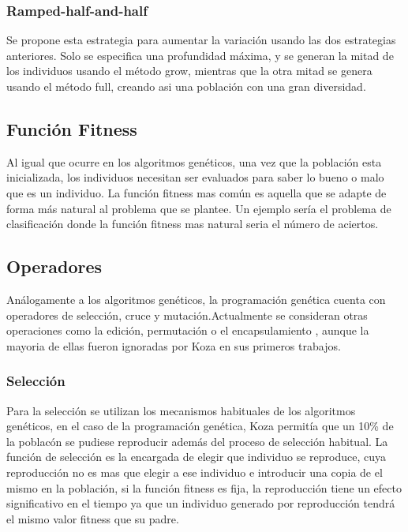 \documentclass[12pt]{article} \usepackage[utf8x]{inputenc}
\begin{document}
 \subsubsection{Ramped-half-and-half}
 
 Se propone esta estrategia para aumentar la variación usando las dos estrategias anteriores. Solo se especifica una profundidad máxima, y se generan la mitad de los individuos usando el método grow, mientras que la otra mitad se genera usando el método full, creando asi una población con una gran diversidad.
 
 \subsection{Función Fitness}
 
 Al igual que ocurre en los algoritmos genéticos, una vez que la población esta inicializada, los individuos necesitan ser evaluados para saber lo bueno o malo que es un individuo. La función fitness mas común es aquella que se adapte de forma más natural al problema que se plantee. Un ejemplo sería  el problema de clasificación donde la función fitness mas natural seria el número de aciertos.
 
 \subsection{Operadores}
 
 Análogamente a los algoritmos genéticos, la programación genética cuenta con operadores de selección, cruce y mutación.Actualmente se consideran otras operaciones como la edición, permutación o el encapsulamiento , aunque la mayoria de ellas fueron ignoradas por Koza en sus primeros trabajos.
 
 \subsubsection{Selección}
 
 Para la selección se utilizan los mecanismos habituales de los algoritmos genéticos, en el caso de la programación genética, Koza permitía que un 10\% de la poblacón se pudiese reproducir además del proceso de selección habitual. La función de selección es la encargada de elegir que individuo se reproduce, cuya reproducción no es mas que elegir a ese individuo e introducir una copia de el mismo en la población, si la función fitness es fija, la reproducción tiene un efecto significativo en el tiempo ya que un individuo generado por reproducción tendrá el mismo valor fitness que su padre.
 
\end{document}
